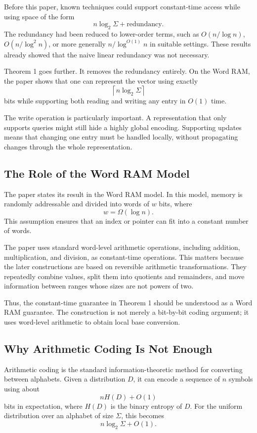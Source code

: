 Before this paper, known techniques could support constant-time access while using space of the form
\[
    n\log_2 \Sigma + \text{redundancy}.
\]
The redundancy had been reduced to lower-order terms, such as \(O(n/\log n)\), \(O(n/\log^2 n)\), or more generally \(n/\log^{O(1)} n\) in suitable settings. These results already showed that the naive linear redundancy was not necessary.

Theorem 1 goes further. It removes the redundancy entirely. On the Word RAM, the paper shows that one can represent the vector using exactly
\[
    \left\lceil n \log_2 \Sigma \right\rceil
\]
bits while supporting both reading and writing any entry in \(O(1)\) time.

The write operation is particularly important. A representation that only supports queries might still hide a highly global encoding. Supporting updates means that changing one entry must be handled locally, without propagating changes through the whole representation.

\subsection{The Role of the Word RAM Model}

The paper states its result in the Word RAM model. In this model, memory is randomly addressable and divided into words of \(w\) bits, where
\[
    w = \Omega(\log n).
\]
This assumption ensures that an index or pointer can fit into a constant number of words.

The paper uses standard word-level arithmetic operations, including addition, multiplication, and division, as constant-time operations. This matters because the later constructions are based on reversible arithmetic transformations. They repeatedly combine values, split them into quotients and remainders, and move information between ranges whose sizes are not powers of two.

Thus, the constant-time guarantee in Theorem 1 should be understood as a Word RAM guarantee. The construction is not merely a bit-by-bit coding argument; it uses word-level arithmetic to obtain local base conversion.

\subsection{Why Arithmetic Coding Is Not Enough}

Arithmetic coding is the standard information-theoretic method for converting between alphabets. Given a distribution \(D\), it can encode a sequence of \(n\) symbols using about
\[
    nH(D) + O(1)
\]
bits in expectation, where \(H(D)\) is the binary entropy of \(D\). For the uniform distribution over an alphabet of size \(\Sigma\), this becomes
\[
    n\log_2 \Sigma + O(1).
\]

